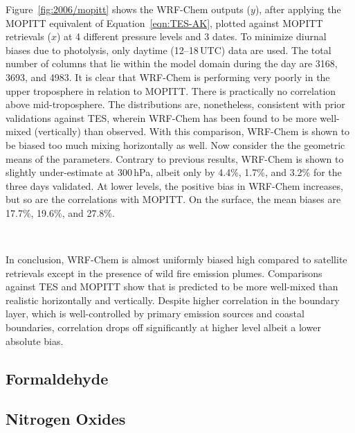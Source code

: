 
Figure~\ref{fig:2006/mopitt} shows the WRF-Chem  outputs ($y$), after applying the MOPITT equivalent of Equation~\ref{eqn:TES-AK}, plotted against MOPITT
retrievals ($x$) at 4 different pressure levels and 3 dates. To minimize diurnal biases due to photolysis, only daytime (12--18\,\unit{UTC}) data are used. The total number
of columns that lie within the model domain during the day are 3168, 3693, and 4983. It is clear that WRF-Chem is performing very poorly in the upper troposphere in relation
to MOPITT. There is practically no correlation above mid-troposphere. The distributions are, nonetheless, consistent with prior validations against TES, wherein WRF-Chem
 has been found to be more well-mixed (vertically) than observed. With this comparison, WRF-Chem is shown to be biased too much mixing horizontally as well.
Now consider the the geometric means of the parameters. Contrary to previous results, WRF-Chem is shown to slightly under-estimate  at 300\,\unit{hPa}, albeit
only by 4.4\%, 1.7\%, and 3.2\% for the three days validated. At lower levels, the positive bias in WRF-Chem increases, but so are the correlations with MOPITT. On the
surface, the mean biases are 17.7\%, 19.6\%, and 27.8\%.

\,

In conclusion, WRF-Chem  is almost uniformly biased high compared to satellite retrievals except in the presence of wild fire emission plumes. Comparisons against
TES and MOPITT show that  is predicted to be more well-mixed than realistic horizontally and vertically. Despite higher correlation in the boundary layer, which is
well-controlled by primary emission sources and coastal boundaries, correlation drops off significantly at higher level albeit a lower absolute bias.

\subsection{Formaldehyde}\label{ssec:2006/gen/form}
\subsection{Nitrogen Oxides}\label{ssec:2006/gen/nox}

